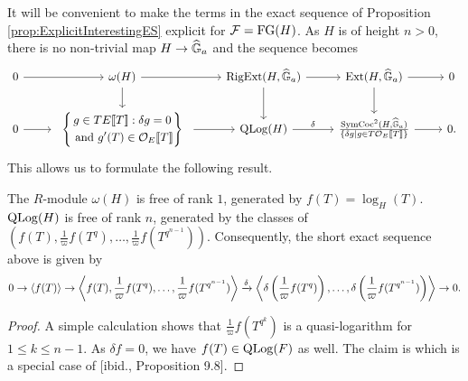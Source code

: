 \documentclass[../main.tex]{subfiles}
\begin{document}
It will be convenient to make the terms in the exact sequence of Proposition 
\ref{prop:ExplicitInterestingES} explicit for $\mathcal{F} = \textnormal{FG}(H)$. As $H$ is of height $n>0$, 
there is no non-trivial map $H \to \widehat{\mathbb{G}}_a$ and the sequence becomes
\begin{equation*}
\begin{tikzcd}[ampersand replacement=\&]
	0 \& {\omega(H)} \& {\RigExt(H,\Ghat_a)} \& {\Ext(H,\Ghat_a)} \& 0 \\
	0 \& \begin{array}{c} \left\{\begin{gathered} {g \in TE\llbr T \rrbr : \delta g = 0} \\          \text{ and $g'(T) \in \cO_E\llbr T \rrbr$}\end{gathered} \right\} \end{array} \& {\QLog(H)} \& {\frac{\SymCoc^2(H, \Ghat_a)}{\{\delta g \mid g \in T \cO_E\llbr T \rrbr\}}} \& 0.
	\arrow[from=1-1, to=1-2]
	\arrow[from=1-2, to=1-3]
	\arrow[from=1-2, to=2-2]
	\arrow[from=1-3, to=1-4]
	\arrow[from=1-3, to=2-3]
	\arrow[from=1-4, to=1-5]
	\arrow[from=1-4, to=2-4]
	\arrow["", from=2-1, to=2-2]
	\arrow[from=2-2, to=2-3]
	\arrow["\delta", from=2-3, to=2-4]
	\arrow[from=2-4, to=2-5]
\end{tikzcd}   
\end{equation*}
This allows us to formulate the following result.
\begin{prop}
  The $R$-module $\omega(H)$ is free of rank $1$, generated by 
  $f(T) = \log_H(T)$. $\operatorname {QLog}(H)$ is free of rank $n$, generated by the classes of
  $(f(T), \frac 1\varpi f(T^q), \dots, \frac 1\varpi f(T^{q^{n-1}}))$. Consequently,
  the short exact sequence above is given by 
  \begin{equation*}
    0 \to \left \langle f(T) \right \rangle \to \left \langle f(T), \frac 1\varpi
      f(T^q) , \dots,
    \frac 1\varpi f(T^{q^{n-1}}) \right \rangle \xrightarrow{\delta} 
    \left \langle \delta \left(\frac 1\varpi f(T^q)\right),\dots, \delta
    \left(\frac 1\varpi f(T^{q^{n-1}})\right ) \right \rangle \to 0.
  \end{equation*}
\begin{proof}
  A simple calculation shows that $\frac 1\varpi f(T^{q^k})$ is a quasi-logarithm for 
  $1 \leq k \leq n-1$. As $\delta f = 0$, we have $f(T) \in \operatorname {QLog}(F)$ as well. 
  The claim is \cite[Proposition 13.8]{hopkins1994equivariant} which is a 
  special case of [ibid., Proposition 9.8].
\end{proof}
\end{prop}
\end{document}
